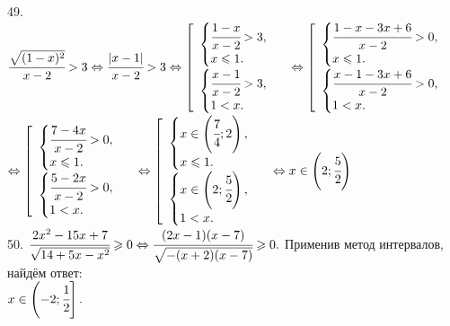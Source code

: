 49. $\cfrac{\sqrt{(1-x)^2}}{x-2}>3\Leftrightarrow\cfrac{|x-1|}{x-2}>3\Leftrightarrow\left[\begin{array}{l} \begin{cases} \cfrac{1-x}{x-2}>3,\\
x\leqslant1.\end{cases}\\ \begin{cases} \cfrac{x-1}{x-2}>3,\\ 1<x.\end{cases}\end{array}\right.\Leftrightarrow\left[\begin{array}{l} \begin{cases} \cfrac{1-x-3x+6}{x-2}>0,\\ x\leqslant1.\end{cases}\\ \begin{cases} \cfrac{x-1-3x+6}{x-2}>0,\\ 1<x.\end{cases}\end{array}\right.$\\$\Leftrightarrow\left[\begin{array}{l} \begin{cases} \cfrac{7-4x}{x-2}>0,\\ x\leqslant1.\end{cases}\\ \begin{cases} \cfrac{5-2x}{x-2}>0,\\ 1<x.\end{cases}\end{array}\right.\Leftrightarrow\left[\begin{array}{l} \begin{cases} x\in\left(\cfrac{7}{4};2\right),\\ x\leqslant1.\end{cases}\\ \begin{cases} x\in\left(2;\cfrac{5}{2}\right),\\ 1<x.\end{cases}\end{array}\right.\Leftrightarrow x\in\left(2;\cfrac{5}{2}\right)$\\
50. $\cfrac{2x^2-15x+7}{\sqrt{14+5x-x^2}}\geqslant0\Leftrightarrow\cfrac{(2x-1)(x-7)}{\sqrt{-(x+2)(x-7)}}\geqslant0.$ Применив метод интервалов, найдём ответ:\\ $x\in\left(-2;\cfrac{1}{2}\right].$
\begin{figure}[ht!]
\end{figure}\\
